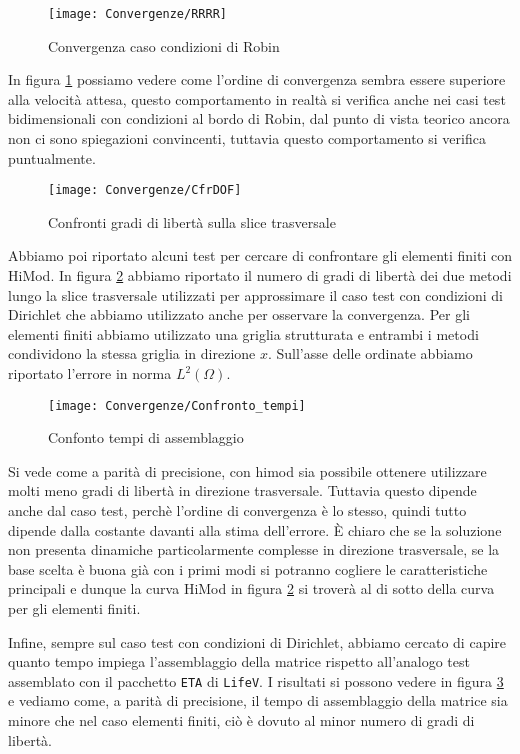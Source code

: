 \begin{figure}[!h]
\centering
\texttt{[image: Convergenze/RRRR]}
\caption{Convergenza caso condizioni di Robin}
\label{fig:rrrr_conv}
\end{figure}

In figura \ref{fig:rrrr_conv} possiamo 
vedere come l'ordine di convergenza sembra essere superiore alla velocit\`a attesa, questo comportamento in realt\`a 
si verifica anche nei casi test bidimensionali con condizioni al bordo di Robin, dal punto di vista teorico ancora non ci sono 
spiegazioni convincenti, tuttavia questo comportamento si verifica puntualmente.

\begin{figure}[!h]
\centering
\texttt{[image: Convergenze/CfrDOF]}
\caption{Confronti gradi di libert\`a sulla slice trasversale}
\label{fig:dof}
\end{figure}

Abbiamo poi riportato alcuni test per cercare di confrontare gli elementi finiti con HiMod.
In figura \ref{fig:dof} abbiamo riportato il numero di gradi di libert\`a dei due metodi lungo la slice trasversale utilizzati per 
approssimare il caso test con condizioni di Dirichlet che abbiamo utilizzato anche per osservare la convergenza.
Per gli elementi finiti abbiamo utilizzato una griglia strutturata e entrambi i metodi condividono la stessa griglia 
in direzione $x$. Sull'asse delle ordinate abbiamo riportato l'errore in norma $L^2(\Omega)$.

\begin{figure}[!htbp]
\centering
\texttt{[image: Convergenze/Confronto\_tempi]}
\caption{Confonto tempi di assemblaggio}
\label{fig:time}
\end{figure}

Si vede come a parit\`a di precisione, con himod sia possibile ottenere utilizzare molti meno gradi di libert\`a in direzione trasversale.
Tuttavia questo dipende anche dal caso test, perch\`e l'ordine di convergenza \`e lo stesso, quindi tutto dipende dalla 
costante davanti alla stima dell'errore. \`E chiaro che se la soluzione non presenta dinamiche particolarmente complesse in direzione trasversale,
se la base scelta \`e buona gi\`a con i primi modi si potranno cogliere le caratteristiche principali e dunque la curva HiMod
in figura \ref{fig:dof} si trover\`a al di sotto della curva per gli elementi finiti.

Infine, sempre sul caso test con condizioni di Dirichlet, abbiamo cercato di capire quanto tempo impiega l'assemblaggio della matrice
rispetto all'analogo test assemblato con il pacchetto \texttt{ETA} di \texttt{LifeV}.
I risultati si possono vedere in figura \ref{fig:time} e vediamo come, a parit\`a di precisione, il tempo di assemblaggio 
della matrice sia minore che nel caso elementi finiti, ci\`o \`e dovuto al minor numero di gradi di libert\`a.